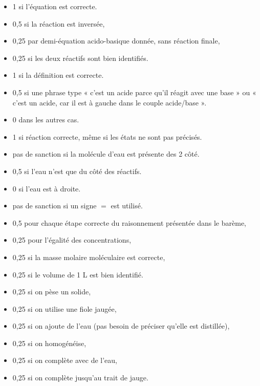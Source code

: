 \begin{multicols}{2}
\numeroQuestion
\begin{itemize}
  \item 1 si l'équation est correcte.
  \item 0,5 si la réaction est inversée,
  \item 0,25 par demi-équation acido-basique donnée, sans réaction finale,
  \item 0,25 si les deux réactifs sont bien identifiés.
\end{itemize}

\numeroQuestion
\begin{itemize}
  \item 1 si la définition est correcte.
  \item 0,5 si une phrase type « c'est un acide parce qu'il réagit avec une base » ou « c'est un acide, car il est à gauche dans le couple acide/base ».
  \item 0 dans les autres cas.
\end{itemize}

\numeroQuestion
\begin{itemize}
  \item 1 si réaction correcte, même si les états ne sont pas précisés.
  \item pas de sanction si la molécule d'eau est présente des 2 côté.
  \item 0,5 si l'eau n'est que du côté des réactifs.
  \item 0 si l'eau est à droite.
  \item pas de sanction si un signe $=$ est utilisé.
\end{itemize}

\numeroQuestion
\begin{itemize}
  \item 0,5 pour chaque étape correcte du raisonnement présentée dans le barème,
  \item 0,25 pour l'égalité des concentrations,
  \item 0,25 si la masse molaire moléculaire est correcte,
  \item 0,25 si le volume de 1 L est bien identifié.
\end{itemize}

\numeroQuestion
\begin{itemize}
  \item 0,25 si on pèse un solide,
  \item 0,25 si on utilise une fiole jaugée,
  \item 0,25 si on ajoute de l'eau (pas besoin de préciser qu'elle est distillée),
  \item 0,25 si on homogénéise,
  \item 0,25 si on complète avec de l'eau,
  \item 0,25 si on complète jusqu'au trait de jauge.
\end{itemize}


\end{multicols}
